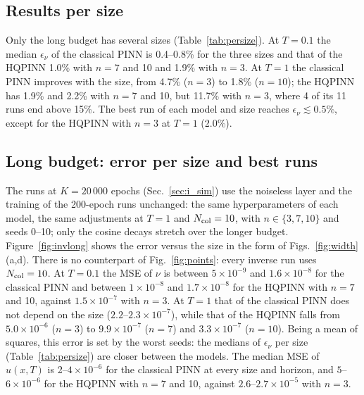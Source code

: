 \documentclass[floatfix,aps,pra,twocolumn,superscriptaddress,10pt,nofootinbib]{revtex4-2}
\newcommand{\Ncol}{N_{\rm col}}
\begin{document}
\begin{appendices}
\subsection{Results per size}\label{app:isize}
Only the long budget has several sizes (Table~\ref{tab:persize}). At $T=0.1$ the median $\epsilon_\nu$ of the classical PINN is 0.4--0.8\% for the three sizes and that of the HQPINN 1.0\% with $n=7$ and 10 and 1.9\% with $n=3$. At $T=1$ the classical PINN improves with the size, from 4.7\% ($n=3$) to 1.8\% ($n=10$); the HQPINN has 1.9\% and 2.2\% with $n=7$ and 10, but 11.7\% with $n=3$, where 4 of its 11 runs end above 15\%. The best run of each model and size reaches $\epsilon_\nu\lesssim0.5\%$, except for the HQPINN with $n=3$ at $T=1$ (2.0\%).

\begin{table}[h]
\caption{\justifying Relative error of the learned viscosity, $\epsilon_\nu$ (median / mean / max over seeds 0--10, in \%), and median relative $L_2$ error of $u(x,T)$, per size $n$, at $K=20\,000$ with the ideal circuit; $\nu_{\rm true}=0.01$.}
\label{tab:persize}
\setlength{\tabcolsep}{1pt}
\footnotesize
\begin{ruledtabular}

\end{ruledtabular}
\end{table}

\subsection{Long budget: error per size and best runs}\label{app:long}
The runs at $K=20\,000$ epochs (Sec.~\ref{sec:i_sim}) use the noiseless layer and the training of the 200-epoch runs unchanged: the same hyperparameters of each model, the same adjustments at $T=1$ and $\Ncol=10$, with $n\in\{3,7,10\}$ and seeds 0--10; only the cosine decays stretch over the longer budget. Figure~\ref{fig:invlong} shows the error versus the size in the form of Figs.~\ref{fig:width}(a,d). There is no counterpart of Fig.~\ref{fig:points}: every inverse run uses $\Ncol=10$. At $T=0.1$ the MSE of $\nu$ is between $5\times10^{-9}$ and $1.6\times10^{-8}$ for the classical PINN and between $1\times10^{-8}$ and $1.7\times10^{-8}$ for the HQPINN with $n=7$ and 10, against $1.5\times10^{-7}$ with $n=3$. At $T=1$ that of the classical PINN does not depend on the size ($2.2$--$2.3\times10^{-7}$), while that of the HQPINN falls from $5.0\times10^{-6}$ ($n=3$) to $9.9\times10^{-7}$ ($n=7$) and $3.3\times10^{-7}$ ($n=10$). Being a mean of squares, this error is set by the worst seeds: the medians of $\epsilon_\nu$ per size (Table~\ref{tab:persize}) are closer between the models. The median MSE of $u(x,T)$ is 2--$4\times10^{-6}$ for the classical PINN at every size and horizon, and $5$--$6\times10^{-6}$ for the HQPINN with $n=7$ and 10, against $2.6$--$2.7\times10^{-5}$ with $n=3$.


\end{appendices}
\end{document}
